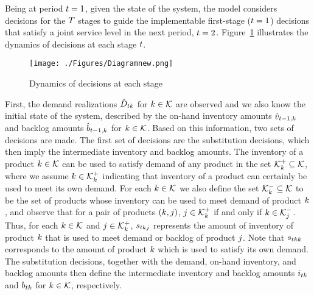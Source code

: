 \documentclass[msom]{oo}
\begin{document}
Being at period $t=1$, given the state of the system, the model considers decisions for the $T$ stages to guide the implementable first-stage ($t =1$) decisions that satisfy a joint service level in the next period, $t=2$.
Figure~\ref{MultistageDynamics} illustrates the dynamics of decisions at each stage $t$. 
\begin{figure}[ht]
\begin{center}
\texttt{[image: ./Figures/Diagramnew.png]}
\caption{Dynamics of decisions at each stage} 
\label{MultistageDynamics}
\end{center}
\end{figure}
First, the demand realizations $\hat{D}_{t k}$ for $k \in \mathcal{K}$ are observed and we also know the initial state of the system, described by the on-hand inventory amounts $\hat{v}_{t-1,k}$ and backlog amounts $\hat{b}_{t-1,k}$ for $k \in \mathcal{K}$. Based on this information, two sets of decisions are made.
The first set of decisions are the substitution decisions, which then imply the intermediate inventory and backlog amounts. 
The inventory of a product $k \in \mathcal{K}$ can be used to satisfy demand of any product in the set $\mathcal{K}^+_k \subseteq \mathcal{K}$, where we assume $k \in \mathcal{K}^+_k$ indicating that inventory of a product can certainly be used to meet its own demand. For each $k \in \mathcal{K}$ we also define the set $ \mathcal{K}^-_k \subseteq \mathcal{K}$ to be the set of products whose inventory can be used to meet demand of product $k$, and observe that for a pair of products $(k,j)$, $j \in \mathcal{K}^+_k$ if and only if $k \in \mathcal{K}^-_{j}$.
Thus, for each $k \in \mathcal{K}$ and $j \in \mathcal{K}^+_k$, ${s}_{t k j}$ represents the amount of inventory of product $k$ that is used to meet demand or backlog of product $j$. Note that  $s_{t k k}$ corresponds to the amount of product $k$ which is used to satisfy its own demand. The substitution decisions, together with the demand, on-hand inventory, and backlog amounts then define the intermediate inventory and backlog amounts $i_{t k}$ and $b_{t k}$ for $k \in \mathcal{K}$, respectively. 
\end{document}
